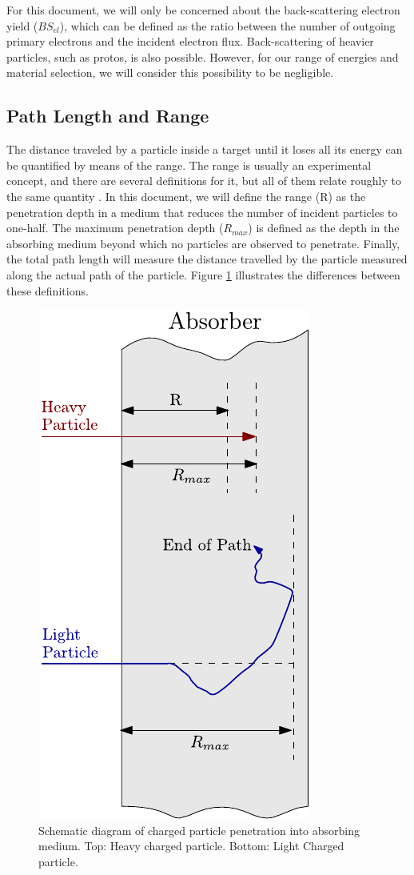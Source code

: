 For this document, we will only be concerned about the back-scattering electron yield ($BS_{el}$), which can be defined as the ratio between the number of outgoing primary electrons and the incident electron flux. Back-scattering of heavier particles, such as protos, is also possible. However, for our range of energies and material selection, we will consider this possibility to be negligible.


\subsection{Path Length and Range}
\label{sec:Range}
The distance traveled by a particle inside a target until it loses all its energy can be quantified by means of the range. The range is usually an experimental concept, and there are several definitions for it, but all of them relate roughly to the same quantity \parencite*[][]{ref:Knoll}. In this document, we will define the range (R) as the penetration depth in a medium that reduces the number of incident particles to one-half. The maximum penetration depth ($R_{max}$) is defined as the depth in the absorbing medium beyond which no particles are observed to penetrate. Finally, the total path length will measure the distance travelled by the particle measured along the actual path of the particle. Figure \ref{fig:RangeVsPathLength} illustrates the differences between these definitions. 

\begin{figure}[h]
    \centering
    \includegraphics[width=0.30\columnwidth]{RangeVsPath/RangeVsPath.pdf}
    \caption{Schematic diagram of charged particle penetration into absorbing medium. Top: Heavy charged particle. Bottom: Light Charged particle.}
    \label{fig:RangeVsPathLength}
\end{figure}


